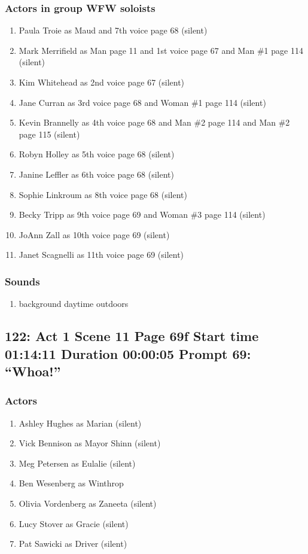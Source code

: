 \subsubsection{Actors in group WFW soloists}
\begin{enumerate}
\item Paula Troie as Maud and 7th voice page 68 (silent)
\item Mark Merrifield as Man page 11 and 1st voice page 67 and Man \#1 page 114 (silent)
\item Kim Whitehead as 2nd voice page 67 (silent)
\item Jane Curran as 3rd voice page 68 and Woman \#1 page 114 (silent)
\item Kevin Brannelly as 4th voice page 68 and Man \#2 page 114 and Man \#2 page 115 (silent)
\item Robyn Holley as 5th voice page 68 (silent)
\item Janine Leffler as 6th voice page 68 (silent)
\item Sophie Linkroum as 8th voice page 68 (silent)
\item Becky Tripp as 9th voice page 69 and Woman \#3 page 114 (silent)
\item JoAnn Zall as 10th voice page 69 (silent)
\item Janet Scagnelli as 11th voice page 69 (silent)
\end{enumerate}

\subsubsection{Sounds}
\begin{enumerate}
\item background daytime outdoors
\end{enumerate}
\subsection{122: Act 1 Scene 11 Page 69f Start time 01:14:11 Duration 00:00:05 Prompt 69: ``Whoa!''}

\subsubsection{Actors}
\begin{enumerate}
\item Ashley Hughes as Marian (silent)
\item Vick Bennison as Mayor Shinn (silent)
\item Meg Petersen as Eulalie (silent)
\item Ben Wesenberg as Winthrop
\item Olivia Vordenberg as Zaneeta (silent)
\item Lucy Stover as Gracie (silent)
\item Pat Sawicki as Driver (silent)
\end{enumerate}

